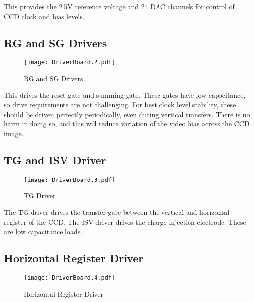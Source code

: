 This provides the 2.5V reference voltage and 24 DAC channels for control of CCD clock and bias levels.
  


\subsection{RG and SG Drivers}
   \begin{figure}
   \begin{center}
   \texttt{[image: DriverBoard.2.pdf]}
   \end{center}
   \caption{RG and SG Drivers}
   \end{figure}

This drives the reset gate and summing gate. These gates have low capacitance, so drive requirements are not challenging. For best clock level stability, these should be driven perfectly periodically, even during vertical transfers. There is no harm in doing so, and this will reduce variation of the video bias across the CCD image.
  


\subsection{TG and ISV Driver}
   \begin{figure}
   \begin{center}
   \texttt{[image: DriverBoard.3.pdf]}
   \end{center}
   \caption{TG Driver}
   \end{figure}
   
The TG driver drives the transfer gate between the vertical and horizontal register of the CCD. The ISV driver drives the charge injection electrode. These are low capacitance loads.
  


\subsection{Horizontal Register Driver}
   \begin{figure}
   \begin{center}
   \texttt{[image: DriverBoard.4.pdf]}
   \end{center}
   \caption{Horizontal Register Driver}
   \end{figure}
   
